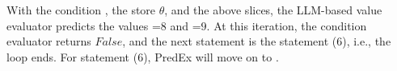 With the condition , the store $\theta$, and the above
slices, the LLM-based value evaluator predicts the values =$8$
and =$9$. At this iteration, the condition evaluator
returns $False$, and the next statement is the statement (6), i.e.,
the loop ends.  For statement (6), PredEx will move on to
.

